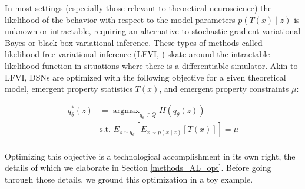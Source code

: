 \documentclass[11pt]{article}
\DeclareMathOperator*{\argmax}{argmax}
\begin{document}
In most settings (especially those relevant to theoretical neuroscience) the likelihood of the behavior with respect to the model parameters $p(T(x) \mid z)$ is unknown or intractable, requiring an alternative to stochastic gradient variational Bayes \cite{kingma2013auto} or black box variational inference\cite{ranganath2014black}.  These types of methods called likelihood-free variational inference (LFVI, \cite{tran2017hierarchical}) skate around the intractable likelihood function in situations where there is a differentiable simulator. Akin to LFVI, DSNs are optimized with the following objective for a given theoretical model, emergent property statistics $T(x)$, and emergent property constraints $\mu$:

\begin{equation}
\begin{split}
q_\theta^*(z) &= \argmax_{q_\theta \in Q} H(q_\theta(z)) \\
 &  \text{s.t.  } E_{z \sim q_\theta}\left[ E_{x\sim p(x \mid z)}\left[T(x)\right] \right] = \mu \\
 \end{split}
\end{equation}

Optimizing this objective is a technological accomplishment in its own right, the details of which we elaborate in Section \ref{methods_AL_opt}.  Before going through those details, we ground this optimization in a toy example.
\end{document}
